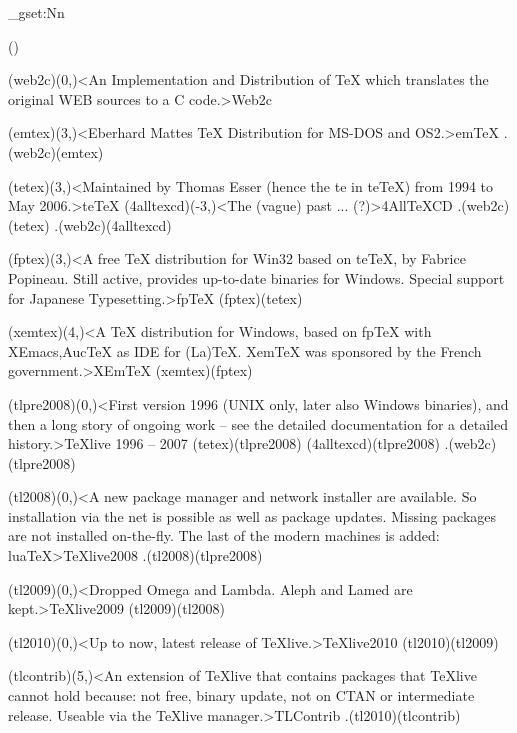 \documentclass[
%
]{scrartcl}
\begin{document}
\ExplSyntaxOn
\fp_gset:Nn
\ExplSyntaxOff

\tograph(){
	\tonode(web2c)(0,\layer)<An Implementation and Distribution of TeX which translates the original WEB sources to a C code.>{Web2c}
	\steplayer

	\tonode(emtex)(3,\layer)<Eberhard Mattes TeX Distribution for MS-DOS and OS2.>{em\TeX}
	\todraw.(web2c)(emtex)
	\steplayer

	\tonode(tetex)(3,\layer)<Maintained by Thomas Esser (hence the te in teTeX) from 1994 to May 2006.>{te\TeX}
	\tonode(4alltexcd)(-3,\layer)<The (vague) past ... (?)>{4All\TeX CD }
	\todraw.(web2c)(tetex)
	\todraw.(web2c)(4alltexcd)
	\steplayer

	\tonode(fptex)(3,\layer)<A free TeX distribution for Win32 based on teTeX, by Fabrice Popineau. Still active, provides up-to-date binaries for Windows. Special support for Japanese Typesetting.>{fp\TeX}
	\todraw(fptex)(tetex)
	\steplayer

	\tonode(xemtex)(4,\layer)<A TeX distribution for Windows, based on fpTeX with XEmacs,AucTeX as IDE for (La)TeX. XemTeX was sponsored by the French government.>{XEm\TeX}
	\todraw(xemtex)(fptex)

	\tonode(tlpre2008)(0,\layer)<First version 1996 (UNIX only, later also Windows binaries), and then a long story of ongoing work -- see the detailed documentation for a detailed history.>{\TeX live 1996 – 2007}
	\todraw(tetex)(tlpre2008)
	\todraw(4alltexcd)(tlpre2008)
	\todraw.(web2c)(tlpre2008)
	\steplayer

	\tonode(tl2008)(0,\layer)<A new package manager and network installer are available. So installation via the net is possible as well as package updates. Missing packages are not installed on-the-fly. The last of the modern machines is added: luaTeX>{\TeX live2008}
	\todraw.(tl2008)(tlpre2008)
	\steplayer

	\tonode(tl2009)(0,\layer)<Dropped Omega and Lambda. Aleph and Lamed are kept.>{\TeX live2009}
	\todraw(tl2009)(tl2008)
	\steplayer

	\tonode(tl2010)(0,\layer)<Up to now, latest release of TeXlive.>{\TeX live2010}
	\todraw(tl2010)(tl2009)

	\tonode(tlcontrib)(5,\layer)<An extension of TeXlive that contains packages that TeXlive cannot hold because: not free, binary update, not on CTAN or intermediate release. Useable via the TeXlive manager.>{TLContrib}
	\todraw.(tl2010)(tlcontrib)
}
\end{document}
